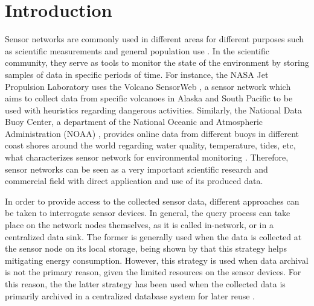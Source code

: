 


\chapter{Introduction}

Sensor networks are commonly used in different areas for different purposes
such as scientific measurements and general population use
\cite{sn-intro01} \cite{sn-intro02}. In the scientific community, they serve as
tools to monitor the state of the environment by storing samples of data in specific 
periods of time. For instance, the NASA Jet Propulsion Laboratory uses the 
Volcano SensorWeb \cite{sn-ex02}, a sensor network which aims to collect data
from specific volcanoes in Alaska and South Pacific to be used with heuristics 
regarding dangerous activities. Similarly, the National Data Buoy Center, a
department of the National Oceanic and Atmospheric Administration (NOAA)
\cite{sn-ex03}, provides online data from different buoys in different coast
shores around the world regarding water quality, temperature, tides, etc, what 
characterizes sensor network for environmental monitoring \cite{sn-ex01}.
Therefore, sensor networks can be seen as a very important scientific research and 
commercial field with direct application and use of its produced data.

In order to provide access to the collected sensor data, different approaches
can be taken to interrogate sensor devices. In general, the query process can
take place on the network nodes themselves, as it is called in-network, or in 
a centralized data sink. The former is generally used when the data is
collected at the sensor node on its local storage, being shown by \cite{sn-storage01}
\cite{sn-storage03} \cite{sn-storage04} that this strategy helps mitigating energy
consumption. However, this strategy is used when data archival is not the
primary reason, given the limited resources on the sensor devices. For this
reason, the the latter strategy has been used when the collected data is
primarily archived in a centralized database system for later reuse
\cite{sn-storage02}.

